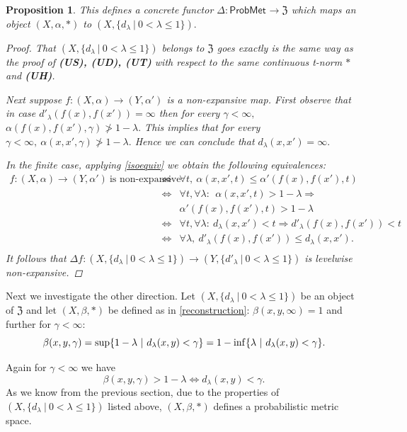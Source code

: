 \documentclass[12pt,a4paper]{amsart}
\theoremstyle{theorem}
\newtheorem{proposition}[theorem]{Proposition}
\theoremstyle{definition}
\newcommand{\zz}{\ensuremath{\mathfrak{Z}}}
\newcommand{\PM}{\ensuremath{\mathsf{ProbMet_{}}}}
\renewcommand{\inf}{\myinf}
\DeclareMathOperator*{\myinf}{in\vphantom{p}f}
\renewcommand{\a}{\ensuremath{\alpha}}
\renewcommand{\b}{\ensuremath{\beta}}
\renewcommand{\l}{\ensuremath{\lambda}}
\def\rw{\rightarrow}
\begin{document}
{\begin{proposition}\label{delta}
This defines a concrete functor $\Delta: \PM \rw \zz$ which maps an object $(X,\a, *)$ to  $(X, \{ d_\l \ | \ 0 < \l \leq 1 \}).$
\begin{proof}
That $(X, \{ d_\l \ | \ 0 < \l \leq 1 \})$ belongs to $\zz$ goes exactly is the same way as the proof of {\bf(US), (UD), (UT)} with respect to the same continuous t-norm $*$ and {\bf(UH)}.

Next suppose $f: (X,\a) \rw (Y, \a')$ is a non-expansive map.
First observe that in case $d'_\l (f(x), f(x'))= \infty$ then for every $\gamma < \infty,$
$ \a(f(x), f(x'), \gamma) \not > 1 - \l.$
This implies that for every $\gamma < \infty, \ \a(x,x',\gamma) \not > 1 - \l.$ Hence we can conclude that $d_\l(x,x') = \infty.$

 In the finite case, applying \eqref{isoequiv} we obtain the following equivalences:
  \begin{eqnarray*}\label{morfequiv}
  f: (X,\a) \rw (Y, \a')\  \text{is non-expansive} \ &\Leftrightarrow & \forall t, \ \a(x,x',t) \leq \a'(f(x), f(x'), t )\\
&\Leftrightarrow& \forall t, \forall \l : \ \ \a(x,x', t) > 1 - \l  \Rightarrow\\
&& \a'(f(x), f(x') , t) > 1 - \l \\
&\Leftrightarrow& \forall t,  \forall \l :  \  d_\l(x,x') < t \Rightarrow  d'_\l(f(x), f(x')) < t\\
&\Leftrightarrow& \forall \l, \  d'_\l(f(x), f(x')) \leq d_\l (x,x').\\
\end{eqnarray*}
It follows that $\Delta f: (X, \{ d_\l \ | \ 0 < \l \leq 1 \}) \rw (Y, \{ d'_\l \ | \ 0 < \l \leq 1 \}) $ is levelwise non-expansive.
\end{proof}
\end{proposition}

Next we investigate the other direction.
Let $(X, \{ d_\l \ | \ 0 < \l \leq 1 \})$ be an object of $\zz$ and let $(X, \b, *)$ be defined as in \ref{reconstruction}:
$\b (x,y, \infty ) = 1$ and further for $\gamma < \infty$:
\begin{equation}\label{isomorphbeta}
\b(x,y,\gamma) = \sup \{1 - \l \ | \ d_\l(x, y) < \gamma\} = 1 - \inf  \{\l \ | \ d_\l (x, y) < \gamma\}.
\end{equation}

Again for $\gamma< \infty$ we have
\begin{equation} \label{morphi}
\b(x,y,\gamma) > 1 - \l   \Leftrightarrow  d_\l(x, y) < \gamma.
\end{equation}
As we know from the previous section, due to the properties of  $(X, \{ d_\l \ | \ 0 < \l \leq 1 \})$ listed above, $(X, \b, *)$ defines a probabilistic metric space.

}
\end{document}
